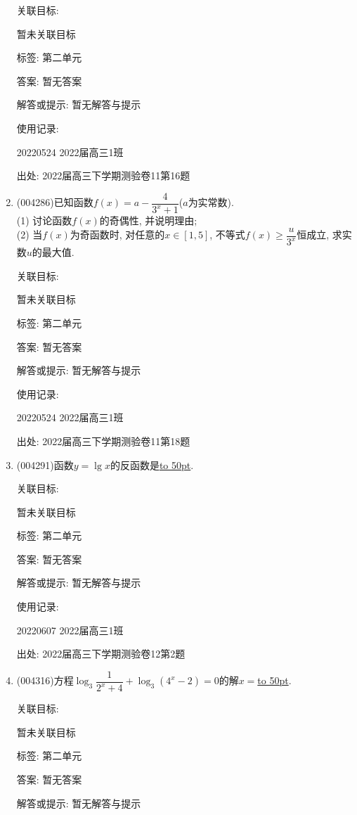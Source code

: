 \documentclass[10pt,a4paper]{article}
\newcommand{\blank}[1]{\underline{\hbox to #1pt{}}}
\begin{document}
\begin{enumerate}[1.]
关联目标:

暂未关联目标



标签: 第二单元

答案: 暂无答案

解答或提示: 暂无解答与提示

使用记录:

20220524	2022届高三1班	


出处: 2022届高三下学期测验卷11第16题
\item { (004286)}已知函数$f(x)=a-\dfrac 4{3^x+1}$($a$为实常数).\\
(1) 讨论函数$f(x)$的奇偶性, 并说明理由;\\ 
(2) 当$f(x)$为奇函数时, 对任意的$x\in [1,5]$, 不等式$f(x)\ge \dfrac u{3^x}$恒成立, 求实数$u$的最大值.


关联目标:

暂未关联目标



标签: 第二单元

答案: 暂无答案

解答或提示: 暂无解答与提示

使用记录:

20220524	2022届高三1班		


出处: 2022届高三下学期测验卷11第18题
\item { (004291)}函数$y=\lg x$的反函数是\blank{50}.


关联目标:

暂未关联目标



标签: 第二单元

答案: 暂无答案

解答或提示: 暂无解答与提示

使用记录:

20220607	2022届高三1班	


出处: 2022届高三下学期测验卷12第2题
\item { (004316)}方程$\log_3\dfrac 1{2^x+4}+\log_3(4^x-2)=0$的解$x=$\blank{50}.


关联目标:

暂未关联目标



标签: 第二单元

答案: 暂无答案

解答或提示: 暂无解答与提示


\end{enumerate}
\end{document}
